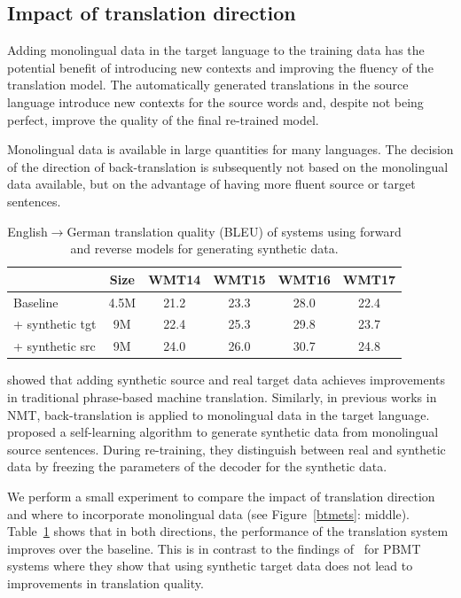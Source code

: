 \subsection{Impact of translation direction}

Adding monolingual data in the target language to the training data has the potential benefit of introducing new contexts and improving the fluency of the translation model.
The automatically generated translations in the source language introduce new contexts for the source words and, despite not being perfect, improve the quality of the final re-trained model.

Monolingual data is available in large quantities for many languages. 
The decision of the direction of back-translation is subsequently not based on the monolingual data available, but on the advantage of having more fluent source or target sentences.

\begin{table}[htb!]
\begin{center}
\caption{\label{dir} English$\rightarrow$German translation quality ({BLEU}) of systems using forward and reverse models for generating synthetic data.}
\begin{tabular}{lccccc}
 \toprule \bf  & \bf 	Size &  \bf WMT14 &  \bf	WMT15 &  \bf	WMT16 &  \bf	WMT17 \\ \midrule%
Baseline	& 4.5M	&	21.2&	23.3&	28.0&	22.4\\
\hspace{.15cm} + synthetic tgt &	9M		&22.4	&25.3	&29.8	&23.7\\
\hspace{.15cm} + synthetic src &	9M		&24.0&	26.0	&30.7	&24.8\\
\bottomrule
\end{tabular}
\end{center}
\end{table}

\citet{Lambert:2011:ITM:2132960.2132997} showed that adding synthetic source and real target data achieves improvements in traditional phrase-based machine translation. Similarly, in previous works in NMT, back-translation is applied to monolingual data in the target language.
\citet{zhang-zong-2016-exploiting} proposed a self-learning algorithm to generate synthetic data from monolingual source sentences. 
During re-training, they distinguish between real and synthetic data by freezing the parameters of the decoder for the synthetic data.

We perform a small experiment to compare the impact of translation direction and where to incorporate monolingual data (see Figure~\ref{btmets}: middle).
Table~\ref{dir} shows that in both directions, the performance of the translation system improves over the baseline. 
%
This is in contrast to the findings of~\citet{Lambert:2011:ITM:2132960.2132997} for PBMT systems where they show that using synthetic target data does not lead to improvements in translation quality.

